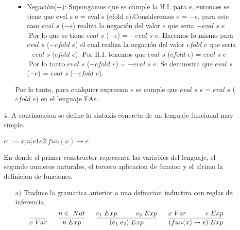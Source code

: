 \documentclass{article}
\begin{document}
\begin{itemize}
\begin{itemize}
\begin{itemize}
                    \item Negación($-$): Supongamos que se cumple la H.I. para $e$, entonces se tiene que eval s e = eval s (cfold e).Consideremos  $e$ = $-e$, para este caso $eval$ $s$ ($-e$) realiza la negación del valor $e$ que seria $-eval$ $s$ $e$.Por lo que se tiene $eval$ $s$ ($-e$) = $-eval$ $s$ $e$. Hacemos lo mismo para $eval$ $s$ ($-cfold$ $e$) el cual realiza la negación del valor $cfold$ $e$ que sería $-eval$ $s$ ($cfold$ $e$). Por H.I. tenemos que $eval$ $s$ ($cfold$ $e$) = $eval$ $s$ $e$.Por lo tanto $eval$ $s$ ($-cfold$ $e$) = $-eval$ $s$ $e$. Se demuestra que $eval$ $s$ ($-e$) = $eval$ $s$ ($-cfold$ $e$).\\
                \end{itemize}
                Por lo tanto, para cualquier expresion $e$ se cumple que $eval$ $s$ $e$ = $eval$ $s$ ($cfold$ $e$) en el lenguaje EAs.\\

            \end{itemize}

        \item[4.] A continuacion se define la sintaxis concreta de un lenguaje funcional muy simple.
            \begin{center}
                $e ::= x | n | e1 e2 | fun (x) \rightarrow e$
            \end{center}

        En donde el primer constructor representa las variables del lenguaje, el segundo numeros naturales, el tercero aplicacion de funcion y el ultimo la definicion de funciones.
            \begin{itemize}
                \item[a)] Traduce la gramatica anterior a una definicion inductiva con reglas de inferencia.\\
                    $$
                    \frac{}{x\hspace{0.1cm}Var}\hspace{0.5cm}\frac{n \in\hspace{0.1cm}Nat}{n\hspace{0.1cm}Exp}\hspace{0.5cm}\frac{e_1\hspace{0.1cm}Exp\hspace{1cm}e_2\hspace{0.1cm}Exp}{(e_1\hspace{0.1cm}e_2)\hspace{0.1cm}Exp}\hspace{0.5cm}\frac{x\hspace{0.1cm}Var\hspace{1cm}e\hspace{0.1cm}Exp}{(fun (x) \rightarrow e)\hspace{0.1cm}Exp}
                    $$
                

\end{itemize}
\end{itemize}
\end{document}
